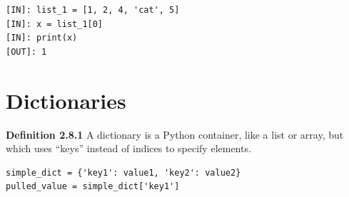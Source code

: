 \begin{lstlisting}
[IN]: list_1 = [1, 2, 4, 'cat', 5]
[IN]: x = list_1[0]
[IN]: print(x)
[OUT]: 1
\end{lstlisting} %

\section{Dictionaries} %
\textbf{Definition 2.8.1} A dictionary is a Python container, like a list or array, but which uses ``keys'' instead of indices to specify elements. %

\begin{lstlisting}
simple_dict = {'key1': value1, 'key2': value2}
pulled_value = simple_dict['key1']
\end{lstlisting} %